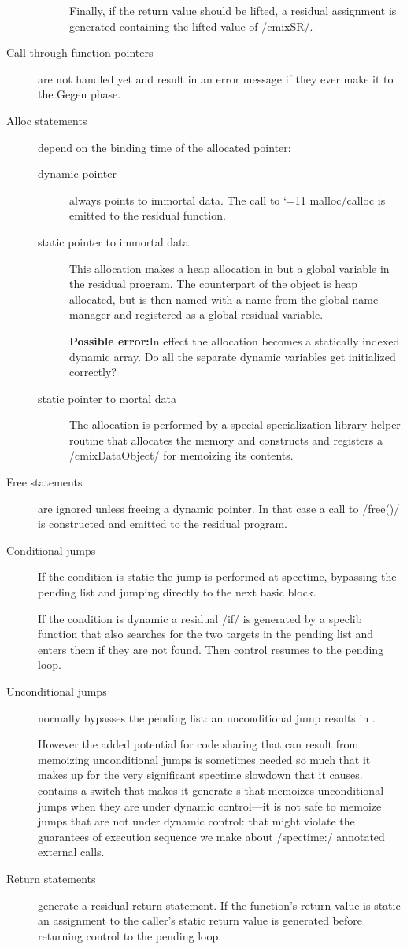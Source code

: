 \begin{docpart}
\begin{description}
\begin{description}
		Finally, if the return value should be lifted, a
		residual assignment is generated containing the
		lifted value of /cmixSR/.
	\end{description}
\item[Call through function pointers] are not handled yet and result
	in an error message if they ever make it to the Gegen phase.
\item[Alloc statements] depend on the binding time of the allocated pointer:
	\begin{description}
	\item[dynamic pointer] always points to immortal data. The
		call to {\catcode`\/=11 malloc/calloc} is emitted
		to the residual function.
	\item[static pointer to immortal data] This allocation
		makes a heap allocation in \Pgen{} but a global
		variable in the residual program. The \Pgen{}
		counterpart of the object is heap allocated,
		but is then named with a name from the global
		name manager and registered as a global residual
		variable.

		\textbf{Possible error:}In effect the allocation
		becomes a statically indexed dynamic array. Do
		all the separate dynamic variables get initialized
		correctly?
	\item[static pointer to mortal data] The allocation is
		performed by a special specialization library helper
		routine that allocates the memory and constructs and
		registers a /cmixDataObject/ for memoizing its
		contents.
	\end{description}
\item[Free statements] are ignored unless freeing a dynamic pointer.
	In that case a call to /free()/ is constructed and emitted
	to the residual program.
\item[Conditional jumps] If the condition is static the jump is
	performed at spectime, bypassing the pending list and jumping
	directly to the next basic block.

	If the condition is dynamic a residual /if/ is generated by
	a speclib function that also searches for the two targets in
	the pending list and enters them if they are not found.
	Then control resumes to the pending loop.
\item[Unconditional jumps] normally bypasses the pending list: an
	unconditional jump results in \Pgen.

	However the added potential for code sharing that can result
	from memoizing unconditional jumps is sometimes needed so much
	that it makes up for the very significant spectime slowdown
	that it causes. \cmix{} contains a switch that makes it
	generate \Pgen{}s that memoizes unconditional jumps when they
	are under dynamic control---it is not safe to memoize jumps
	that are not under dynamic control: that might violate the
	guarantees of execution sequence we make about /spectime:/
	annotated external calls.
\item[Return statements] generate a residual return statement. If
	the function's return value is static an assignment to
	the caller's static return value is generated before returning
	control to the pending loop.
\end{description}


\end{docpart}
